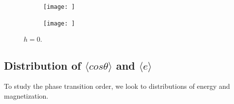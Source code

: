 

 \begin{figure}[H]
	\centering
	\captionsetup{justification=centering}
	\begin{subfigure}[b]{0.45\textwidth}
		\texttt{[image:  ]}
		\caption{  }
		\label{fig:JthetaLinear_1}
	\end{subfigure}
	\begin{subfigure}[b]{0.45\textwidth}
		\texttt{[image:  ]}
		\caption{  }
		\label{fig:JthetaLinear_2}
	\end{subfigure}
	\caption{$h=0$.    }
	\label{fig:JthetaLinear}
\end{figure}

 

\subsection{Distribution of $\langle cos \theta \rangle$ and $\langle e \rangle$ } \label{sec:distributions}
To study the phase transition order, we look to distributions of energy and magnetization.


